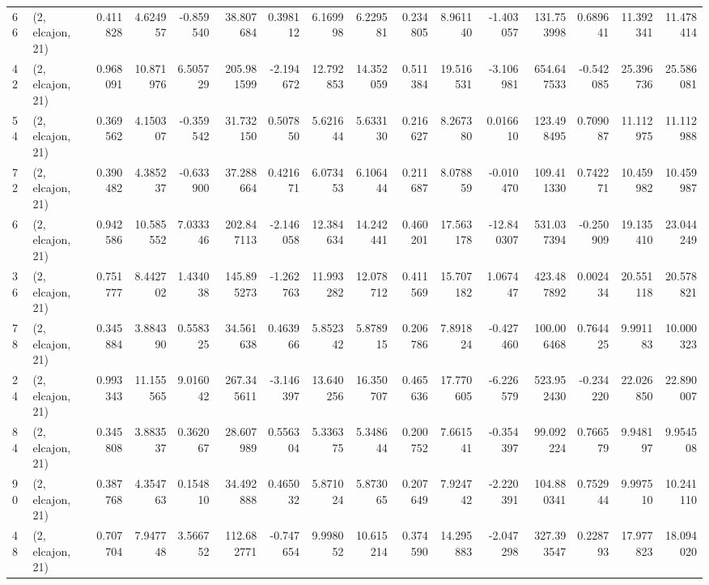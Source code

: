 \begin{tabular}{llrrrrrrrrrrrrrr}
66  &  (2, elcajon, 21) &   0.411828 &   4.624957 &  -0.859540 &    38.807684 &   0.398112 &   6.169998 &   6.229581 &  0.234805 &   8.961140 &  -1.403057 &    131.753998 &    0.689641 &   11.392341 &   11.478414 \\
42  &  (2, elcajon, 21) &   0.968091 &  10.871976 &   6.505729 &   205.981599 &  -2.194672 &  12.792853 &  14.352059 &  0.511384 &  19.516531 &  -3.106981 &    654.647533 &   -0.542085 &   25.396736 &   25.586081 \\
54  &  (2, elcajon, 21) &   0.369562 &   4.150307 &  -0.359542 &    31.732150 &   0.507850 &   5.621644 &   5.633130 &  0.216627 &   8.267380 &   0.016610 &    123.498495 &    0.709087 &   11.112975 &   11.112988 \\
72  &  (2, elcajon, 21) &   0.390482 &   4.385237 &  -0.633900 &    37.288664 &   0.421671 &   6.073453 &   6.106444 &  0.211687 &   8.078859 &  -0.010470 &    109.411330 &    0.742271 &   10.459982 &   10.459987 \\
6   &  (2, elcajon, 21) &   0.942586 &  10.585552 &   7.033346 &   202.847113 &  -2.146058 &  12.384634 &  14.242441 &  0.460201 &  17.563178 & -12.840307 &    531.037394 &   -0.250909 &   19.135410 &   23.044249 \\
36  &  (2, elcajon, 21) &   0.751777 &   8.442702 &   1.434038 &   145.895273 &  -1.262763 &  11.993282 &  12.078712 &  0.411569 &  15.707182 &   1.067447 &    423.487892 &    0.002434 &   20.551118 &   20.578821 \\
78  &  (2, elcajon, 21) &   0.345884 &   3.884390 &   0.558325 &    34.561638 &   0.463966 &   5.852342 &   5.878915 &  0.206786 &   7.891824 &  -0.427460 &    100.006468 &    0.764425 &    9.991183 &   10.000323 \\
24  &  (2, elcajon, 21) &   0.993343 &  11.155565 &   9.016042 &   267.345611 &  -3.146397 &  13.640256 &  16.350707 &  0.465636 &  17.770605 &  -6.226579 &    523.952430 &   -0.234220 &   22.026850 &   22.890007 \\
84  &  (2, elcajon, 21) &   0.345808 &   3.883537 &   0.362067 &    28.607989 &   0.556304 &   5.336375 &   5.348644 &  0.200752 &   7.661541 &  -0.354397 &     99.092224 &    0.766579 &    9.948197 &    9.954508 \\
90  &  (2, elcajon, 21) &   0.387768 &   4.354763 &   0.154810 &    34.492888 &   0.465032 &   5.871024 &   5.873065 &  0.207649 &   7.924742 &  -2.220391 &    104.880341 &    0.752944 &    9.997510 &   10.241110 \\
48  &  (2, elcajon, 21) &   0.707704 &   7.947748 &   3.566752 &   112.682771 &  -0.747654 &   9.998052 &  10.615214 &  0.374590 &  14.295883 &  -2.047298 &    327.393547 &    0.228793 &   17.977823 &   18.094020 \\

\end{tabular}
